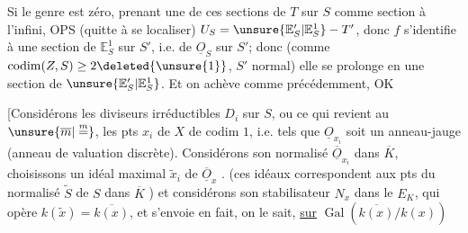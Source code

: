 Si le genre est zéro, prenant une de ces sections de $T$ sur $S$ comme section à l'infini, OPS (quitte à se localiser) $U_S=\unsure{\mathbb E'_S|\mathbb E^1_S}-T'$, donc $f$ s'identifie à une section de $\mathbb E^1_S$ sur $S'$, i.e. de $\underline O_S$ sur $S'$; donc (comme $\operatorname{codim}(Z,S)\geq2\deleted{\unsure{1}}$, $S'$ normal) elle se prolonge en une section de $\unsure{\mathbb E'_S|\mathbb E^1_S}$. Et on achève comme précédemment, OK

[Considérons  les diviseurs irréductibles $D_i$ sur $S$, ou ce qui revient au $\unsure{\overline m|\overset{m}{=}}$, les pts $x_i$ de $X$ de codim $1$, i.e. tels que $\underline O_{x_i}$ soit un anneau-jauge (anneau de valuation discrète). Considérons son normalisé $\overline{\underline O}_{x_i}$ dans $\overline K$, choisissons un idéal maximal $\widetilde x_i$ de $\overline{\underline O}_x$ . (ces idéaux correspondent aux pts du normalisé $\widetilde S$ de $S$ dans $\overline K$ ) et considérons son stabilisateur $N_x$ dans le $E_K$, qui opère  $k(\widetilde x)=\overline{k(x)}$, et s'envoie en fait, on le sait, \uline{sur} $\operatorname{Gal}(\overline{k(x)}/k(x))$
